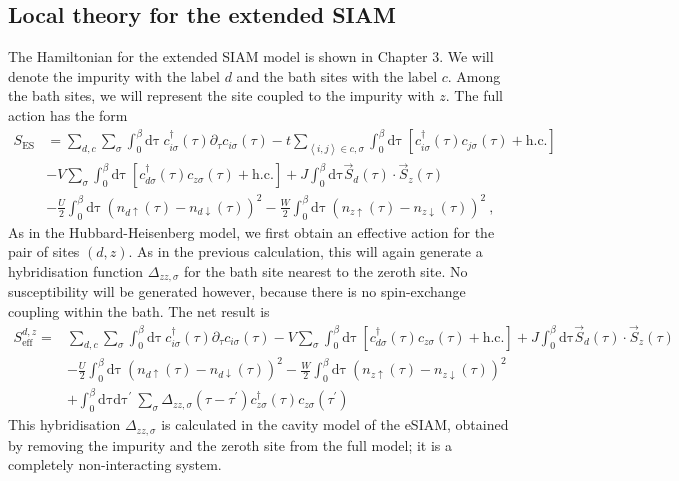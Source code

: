 \subsection{Local theory for the extended SIAM}
The Hamiltonian for the extended SIAM model is shown in Chapter 3. We will denote the impurity with the label \(d\) and the bath sites with the label \(c\). Among the bath sites, we will represent the site coupled to the impurity with \(z\). The full action has the form
\begin{equation}\begin{aligned}
	S_\text{ES} &= \sum_{d,c}\sum_\sigma \int_0^\beta\mathrm{d\tau}~c^\dagger_{i\sigma}(\tau)\partial_\tau c_{i\sigma}(\tau) - t\sum_{\left<i,j \right> \in c,\sigma}\int_0^\beta\mathrm{d\tau}~\left[c^\dagger_{i\sigma}(\tau)c_{j\sigma}(\tau) + \text{h.c.}\right] \\
	&- V\sum_{\sigma}\int_0^\beta\mathrm{d\tau}~\left[c^\dagger_{d\sigma}(\tau)c_{z\sigma}(\tau) + \text{h.c.}\right] + J\int_0^\beta\mathrm{d\tau} \vec{S}_d(\tau)\cdot\vec{S}_{z}(\tau) \\
	&- \frac{U}{2}\int_0^\beta\mathrm{d\tau}~\left(n_{d\uparrow}(\tau) - n_{d\downarrow}(\tau)\right)^2 - \frac{W}{2}\int_0^\beta\mathrm{d\tau}~\left(n_{z\uparrow}(\tau) - n_{z\downarrow}(\tau)\right)^2 ~,
\end{aligned}\end{equation}
As in the Hubbard-Heisenberg model, we first obtain an effective action for the pair of sites \((d,z)\). As in the previous calculation, this will again generate a hybridisation function \(\Delta_{zz,\sigma}\) for the bath site nearest to the zeroth site. No susceptibility will be generated however, because there is no spin-exchange coupling within the bath. The net result is
\begin{equation}\begin{aligned}
	S^{d,z}_\text{eff} =& \sum_{d,c}\sum_\sigma \int_0^\beta\mathrm{d\tau}~c^\dagger_{i\sigma}(\tau)\partial_\tau c_{i\sigma}(\tau) - V\sum_{\sigma}\int_0^\beta\mathrm{d\tau}~\left[c^\dagger_{d\sigma}(\tau)c_{z\sigma}(\tau) + \text{h.c.}\right] + J\int_0^\beta\mathrm{d\tau} \vec{S}_d(\tau)\cdot\vec{S}_{z}(\tau) \\
	&- \frac{U}{2}\int_0^\beta\mathrm{d\tau}~\left(n_{d\uparrow}(\tau) - n_{d\downarrow}(\tau)\right)^2 - \frac{W}{2}\int_0^\beta\mathrm{d\tau}~\left(n_{z\uparrow}(\tau) - n_{z\downarrow}(\tau)\right)^2 \\
	&+ \int_0^\beta\mathrm{d\tau}\mathrm{d\tau^\prime}~\sum_{\sigma}\Delta_{zz,\sigma}(\tau - \tau^\prime)c^\dagger_{z\sigma}(\tau)c_{z\sigma}(\tau^\prime)
\end{aligned}\end{equation}
This hybridisation \(\Delta_{zz,\sigma}\) is calculated in the cavity model of the eSIAM, obtained by removing the impurity and the zeroth site from the full model; it is a completely non-interacting system.

